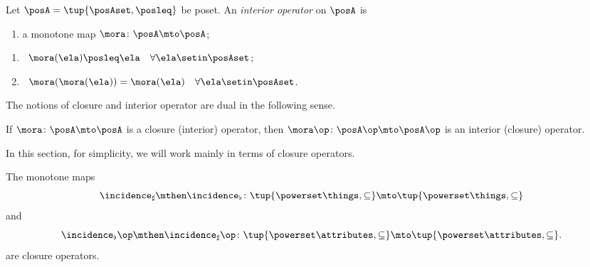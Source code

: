 \begin{definition}\label{def:interior-operator}
Let $\posA = \tup{\posAset, \posleq}$ be poset. An \emph{interior operator} on $\posA$ is

\constit
\begin{enumerate}
\item a monotone map $\mora \colon \posA \mto \posA$; 
\end{enumerate}

\condit
\begin{enumerate}
\item {} \  $\mora(\ela) \posleq \ela \quad \forall \ela \setin \posAset$;
\item {} \ $\mora (\mora(\ela)) =  \mora(\ela) \quad \forall \ela \setin \posAset$. 
\end{enumerate}
\end{definition}

The notions of closure and interior operator are dual in the following sense. 

\begin{lemma}\label{lem:fca-opposites-of-closure-operators}
If $\mora \colon \posA \mto \posA$ is a closure (interior) operator, then $\mora\op \colon \posA\op \mto \posA\op$ is an interior (closure) operator. 
\end{lemma}

In this section, for simplicity, we will work mainly in terms of closure operators. 

\begin{lemma}\label{lem:cfa-closure-operators}
The monotone maps 
\begin{equation}
\incidence_\sharp \mthen \incidence_\flat \colon \tup{\powerset \things, \subseteq} \mto \tup{\powerset \things, \subseteq}
\end{equation}
and 
\begin{equation}
\incidence_\flat\op \mthen \incidence_\sharp\op \colon \tup{\powerset \attributes, \subseteq} \mto \tup{\powerset \attributes, \subseteq}.
\end{equation}
are closure operators. 
\end{lemma}

